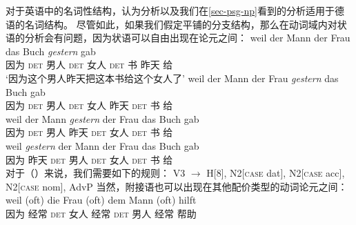 对于英语中的名词性结构，\citet[]{GKPS85a}认为\xbarc 分析以及我们在\ref{sec-psg-np}看到的分析适用于德语的名词结构。
尽管如此，如果我们假定平铺的分支结构，那么在动词域内对状语的分析会有问题，因为状语可以自由出现在论元之间：
\eal
\ex 
\gll weil der Mann der Frau das Buch \emph{gestern} gab\\
	 因为 \textsc{det} 男人 \textsc{det} 女人 \textsc{det} 书 昨天 给\\
\glt `因为这个男人昨天把这本书给这个女人了'
\ex 
\gll weil der Mann der Frau \emph{gestern} das Buch gab\\
	 因为 \textsc{det} 男人 \textsc{det} 女人 昨天 \textsc{det} 书 给\\
\ex 
\gll weil der Mann \emph{gestern} der Frau das Buch gab\\
	 因为 \textsc{det} 男人 昨天 \textsc{det} 女人 \textsc{det} 书 给\\
\ex 
\gll weil \emph{gestern} der Mann der Frau das Buch gab\\
	 因为 昨天 \textsc{det} 男人 \textsc{det} 女人 \textsc{det} 书 给\\
\zl
对于（）来说，我们需要如下的规则：
\ea
\label{regel-ditransitiv-adv}
V3  $\to$ H[8], N2[\textsc{case} dat], N2[\textsc{case} acc], N2[\textsc{case} nom], AdvP
\z
当然，附接语也可以出现在其他配价类型的动词论元之间：
\ea
\gll weil (oft) die Frau (oft) dem Mann (oft) hilft\\
	因为 \spacebr{}经常 \textsc{det} 女人 \spacebr{}经常 \textsc{det} 男人 \spacebr{}经常 帮助\\

